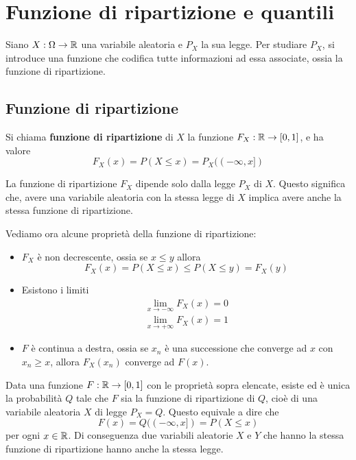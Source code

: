 \section{Funzione di ripartizione e quantili}
Siano $X : \Omega \to \mathbb{R}$ una variabile aleatoria e $P_X$ la sua legge. Per studiare $P_X$, si
introduce una funzione che codifica tutte informazioni ad essa associate, ossia la funzione di
ripartizione.

\subsection{Funzione di ripartizione}
\begin{definition}
	Si chiama \textbf{funzione di ripartizione} di $X$ la funzione $F_X : \mathbb{R} \to [0,1]$, e ha
	valore
	\[ F_X(x) = P (X \leq x) = P_X ((-\infty, x]) \]
\end{definition}

La funzione di ripartizione $F_X$ dipende solo dalla legge $P_X$ di $X$. Questo significa che,
avere una variabile aleatoria con la stessa legge di $X$ implica avere anche la stessa funzione
di ripartizione.

Vediamo ora alcune proprietà della funzione di ripartizione:
\begin{itemize}
	\item $F_X$ è non decrescente, ossia se $x \leq y$ allora
	      \[ F_X(x) = P(X \leq x) \leq P(X \leq y) = F_X(y) \]
	\item Esistono i limiti
	      \begin{gather*}
		      \lim_{x \to -\infty} F_X(x) = 0 \\
		      \lim_{x \to +\infty} F_X(x) = 1
	      \end{gather*}
	\item $F$ è continua a destra, ossia se $x_n$ è una successione che converge ad $x$ con
	      $x_n \geq x$, allora $F_X(x_n)$ converge ad $F(x)$.
\end{itemize}

\begin{proposition}
	Data una funzione $F : \mathbb{R} \to [0,1]$ con le proprietà sopra elencate, esiste ed è unica la
	probabilità $Q$ tale che $F$ sia la funzione di ripartizione di $Q$, cioè di una variabile
	aleatoria $X$ di legge $P_X = Q$. Questo equivale a dire che
	\[ F(x) = Q((-\infty, x]) = P(X \leq x) \]
	per ogni $x \in \mathbb{R}$. Di conseguenza due variabili aleatorie $X$ e $Y$ che hanno la stessa
	funzione di ripartizione hanno anche la stessa legge.
\end{proposition}


